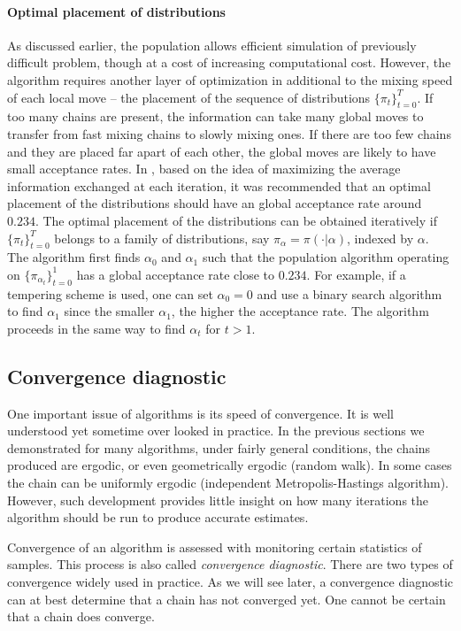 \paragraph{Optimal placement of distributions}

As discussed earlier, the population \mcmc allows efficient simulation of
previously difficult problem, though at a cost of increasing computational
cost. However, the algorithm requires another layer of optimization in
additional to the mixing speed of each local move -- the placement of the
sequence of distributions $\{\pi_t\}_{t=0}^T$. If too many chains are present,
the information can take many global moves to transfer from fast mixing chains
to slowly mixing ones. If there are too few chains and they are placed far
apart of each other, the global moves are likely to have small acceptance
rates. In \cite{Atchade:2010ha}, based on the idea of maximizing the average
information exchanged at each iteration, it was recommended that an optimal
placement of the distributions should have an global acceptance rate around
$0.234$. The optimal placement of the distributions can be obtained
iteratively if $\{\pi_t\}_{t=0}^T$ belongs to a family of distributions, say
$\pi_{\alpha} = \pi(\cdot|\alpha)$, indexed by $\alpha$. The algorithm first
finds $\alpha_0$ and $\alpha_1$ such that the population \mcmc algorithm
operating on $\{\pi_{\alpha_t}\}_{t=0}^1$ has a global acceptance rate close
to $0.234$. For example, if a tempering scheme is used, one can set $\alpha_0
= 0$ and use a binary search algorithm to find $\alpha_1$ since the smaller
$\alpha_1$, the higher the acceptance rate. The algorithm proceeds in the same
way to find $\alpha_t$ for $t>1$.

\subsection{Convergence diagnostic}
\label{sub:Convergence diagnostic}

One important issue of \mcmc algorithms is its speed of convergence. It is
well understood yet sometime over looked in practice. In the previous sections
we demonstrated for many algorithms, under fairly general conditions, the
chains produced are ergodic, or even geometrically ergodic (random walk). In
some cases the chain can be uniformly ergodic (independent Metropolis-Hastings
algorithm). However, such development provides little insight on how many
iterations the algorithm should be run to produce accurate estimates.

Convergence of an \mcmc algorithm is assessed with monitoring certain
statistics of samples. This process is also called \emph{convergence
  diagnostic}. There are two types of convergence
\cite[][chap.~12]{Robert:2004tn} widely used in practice. As we will see
later, a convergence diagnostic can at best determine that a chain has not
converged yet. One cannot be certain that a chain does converge.

